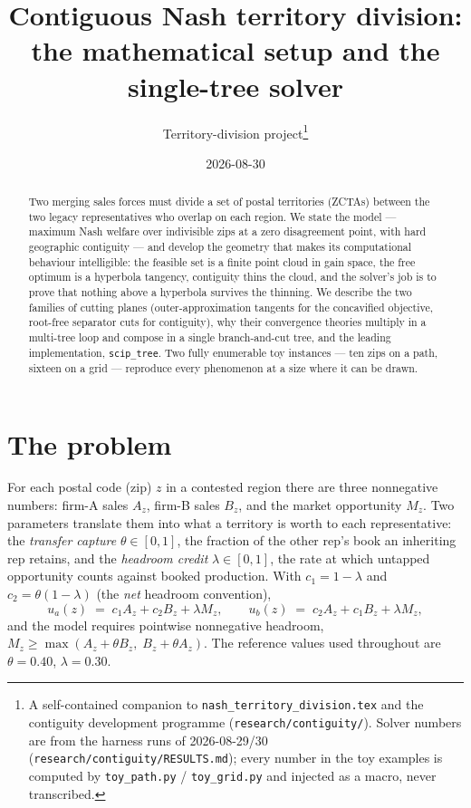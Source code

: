 \documentclass[11pt]{article}
\title{Contiguous Nash territory division:\\ the mathematical setup and the single-tree solver}
\author{Territory-division project\thanks{A self-contained companion to
\texttt{nash\_territory\_division.tex} and the contiguity development programme
(\texttt{research/contiguity/}). Solver numbers are from the harness runs of
2026-08-29/30 (\texttt{research/contiguity/RESULTS.md}); every number in the toy
examples is computed by \texttt{toy\_path.py} / \texttt{toy\_grid.py} and injected
as a macro, never transcribed.}}
\date{2026-08-30}
\theoremstyle{definition}
\newcommand{\ua}{u_a}
\newcommand{\ub}{u_b}
\begin{document}
\maketitle

\begin{abstract}
\noindent
Two merging sales forces must divide a set of postal territories (ZCTAs) between the two
legacy representatives who overlap on each region. We state the model --- maximum Nash
welfare over indivisible zips at a zero disagreement point, with hard geographic
contiguity --- and develop the geometry that makes its computational behaviour
intelligible: the feasible set is a finite point cloud in gain space, the free optimum is
a hyperbola tangency, contiguity thins the cloud, and the solver's job is to prove that
nothing above a hyperbola survives the thinning. We describe the two families of cutting
planes (outer-approximation tangents for the concavified objective, root-free separator
cuts for contiguity), why their convergence theories multiply in a multi-tree loop and
compose in a single branch-and-cut tree, and the leading implementation,
\texttt{scip\_tree}. Two fully enumerable toy instances --- ten zips on a path,
sixteen on a grid --- reproduce every phenomenon at a size where it can be drawn.
\end{abstract}

\section{The problem}\label{sec:problem}

For each postal code (zip) $z$ in a contested region there are three nonnegative numbers:
firm-A sales $A_z$, firm-B sales $B_z$, and the market opportunity $M_z$. Two parameters
translate them into what a territory is worth to each representative: the
\emph{transfer capture} $\theta\in[0,1]$, the fraction of the other rep's book an
inheriting rep retains, and the \emph{headroom credit} $\lambda\in[0,1]$, the rate at
which untapped opportunity counts against booked production. With
$c_1=1-\lambda$ and $c_2=\theta(1-\lambda)$ (the \emph{net} headroom convention),
\begin{equation}\label{eq:utils}
\ua(z) \;=\; c_1 A_z + c_2 B_z + \lambda M_z,
\qquad
\ub(z) \;=\; c_2 A_z + c_1 B_z + \lambda M_z ,
\end{equation}
and the model requires pointwise nonnegative headroom,
$M_z \ge \max(A_z+\theta B_z,\; B_z+\theta A_z)$. The reference values used throughout
are $\theta=0.40$, $\lambda=0.30$.
\end{document}
